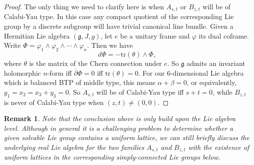 \documentclass{amsart}
\numberwithin{equation}{section}
\newtheorem{remark}  [theorem]     {Remark}
\theoremstyle{definition}
\renewcommand{\1}{\mathds{1}}
\renewcommand{\>}{\rightarrow}
\begin{document}
\begin{proof}
The only thing we need to clarify here is when $A_{s,t}$ or $B_{z,t}$ will be of Calabi-Yau type. In this case any compact quotient of the corresponding Lie group by a discrete subgroup will have trivial canonical line bundle. Given a Hermitian Lie algebra $({\mathfrak g},J,g)$, let $e$ be a unitary frame and $\varphi$ its dual coframe. Write $\Phi = \varphi_1\wedge \varphi_2 \wedge \cdots \wedge \varphi_n$. Then we have
$$ d\Phi = -\mbox{tr} (\theta) \wedge \Phi , $$
where $\theta $ is the matrix of the Chern connection under $e$. So ${\mathfrak g}$ admits an invariant holomorphic $n$-form iff $\overline{\partial} \Phi =0$ iff $\mbox{tr}(\theta)=0$. For our $6$-dimensional Lie algebra which is balanced BTP of middle type, this means $\alpha +\beta =0$, or equivalently, $y_1=x_2=x_3+y_3=0$. So $A_{s,t}$ will be of Calabi-Yau type iff $s+t=0$, while $B_{z,t}$ is never of Calabi-Yau type when $(z,t)\neq (0,0)$.
\end{proof}

\begin{remark}
Note that the conclusion above is only build upon the Lie algebra level. Although in general it is a challenging problem to determine whether a given solvable Lie group contains a uniform lattice, we can still briefly discuss the underlying real Lie algebra for the two families $A_{s,t}$ and $B_{z,t}$ with the existence of uniform lattices in the corresponding simply-connected Lie groups below.
\end{remark}
\end{document}
